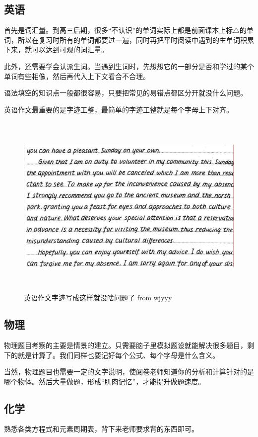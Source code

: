 \documentclass[UTF8,11pt,a4paper]{ctexart}
\begin{document}
		\subsection{英语}
			首先是词汇量。到高三后期，很多“不认识”的单词实际上都是前面课本上标$\triangle$的单词，所以在复习时所有的单词都要过一遍，同时再把平时阅读中遇到的生单词积累下来，就可以达到可观的词汇量。
			
			此外，还需要学会认派生词。当遇到生词时，先想想它的一部分是否和学过的某个单词有些相像，然后再代入上下文看合不合理。
			
			语法填空的知识点一般都很容易，只要把常见的易错点都区分开就没什么问题。
			
			英语作文最重要的是字迹工整，最简单的字迹工整就是每个字母上下对齐。
			
			\begin{figure}[h]
				\centering
				\includegraphics[width=16cm,height=9cm]{2.jpg}
				
				\caption{英语作文字迹写成这样就没啥问题了 from wjyyy}
			\end{figure}
		\subsection{物理}
			物理题目考察的主要是情景的建立。只需要脑子里模拟题设就能解决很多题目，剩下的就是计算了。我们同样也要记好每个公式、每个字母是什么含义。
			
			当然，物理题目也需要一定的文字说明，使阅卷老师知道你的分析和计算针对的是哪个物体。然后大量做题，形成“肌肉记忆”，才能提升做题速度。
		\subsection{化学}
			熟悉各类方程式和元素周期表，背下来老师要求背的东西即可。
			
\end{document}
